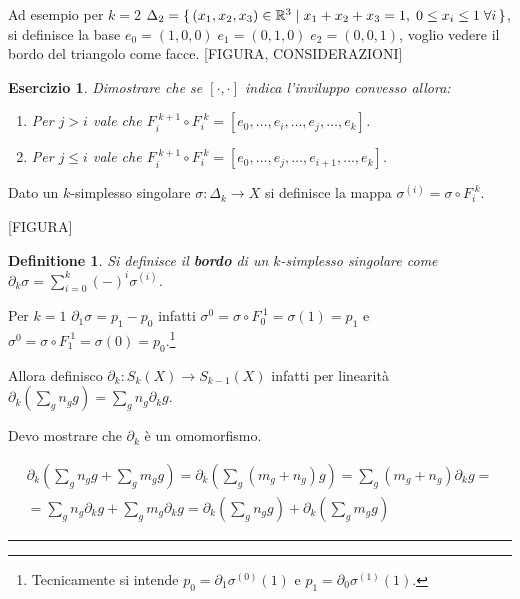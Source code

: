 \documentclass{article}
\newtheorem{definition}[theorem]{Definitione}
\newcounter{exercises}
\newtheorem{exercise}[exercises]{Esercizio}
\newenvironment{proof}{{\bf Dimostrazione:}}{\hfill\rule{2mm}{2mm}}
\newcommand{\RN}[1][]{\mathbb{R}^#1}
\begin{document}
Ad esempio per $ k = 2 $ $ \Delta_2 = \set{ (x_1,x_2,x_3) \in \RN{3} | x_1 + x_2 + x_3 = 1, \; 0 \leq x_i \leq 1 \; \forall i} $,
si definisce la base $ e_0 = (1,0,0) \; e_1 = (0,1,0) \; e_2 = (0,0,1) $, voglio vedere il bordo del triangolo
come facce.
[FIGURA, CONSIDERAZIONI]

\begin{exercise}
  Dimostrare che se $ [\cdot, \cdot] $ indica l'inviluppo convesso allora:
  \begin{enumerate}
  \item Per $ j > i $ vale che $ F_i^{\; k+1} \circ F_i^{\; k} = [e_0, \dots, e_i, \dots, e_j, \dots, e_k ] $.
  \item Per $ j \leq i $ vale che $ F_i^{\; k+1} \circ F_i^{\; k} = [e_0, \dots, e_j, \dots, e_{i+1}, \dots, e_k ] $.
  \end{enumerate}
\end{exercise}

Dato un $ k $-simplesso singolare $ \sigma: \Delta_k \to X $ si definisce la mappa $ \sigma^{(i)} = \sigma \circ F_i^{\; k} $.

[FIGURA]

\begin{definition}
  Si definisce il \textbf{bordo} di un $ k $-simplesso singolare come $ \partial_k \sigma = \sum_{i=0}^{k}(-)^i \sigma^{(i)} $.
\end{definition}

Per $ k = 1 $ $ \partial_1 \sigma = p_1 - p_0 $ infatti $ \sigma^{0} = \sigma \circ F_0^{\; 1} = \sigma(1) = p_1 $ e $ \sigma^{0} = \sigma \circ F_1^{\; 1} = \sigma(0) = p_0 $.\footnote{Tecnicamente si intende $ p_0 = \partial_1 \sigma^{(0)}(1) $ e $ p_1 = \partial_0 \sigma^{(1)}(1) $.}

Allora definisco $ \partial_k: S_k(X) \to S_{k-1}(X) $ infatti per linearità $ \partial_k \left( \sum_g n_g g\right) = \sum_g n_g \partial_k g $.

Devo mostrare che $ \partial_k $ è un omomorfismo.

\begin{proof}
  \begin{gather*}
  \partial_k \left( \sum_g n_g g + \sum_g m_g g\right) = \partial_k \left( \sum_g(m_g + n_g)g \right) = \sum_g (m_g + n_g) \partial_k g = \\
  = \sum_g n_g \partial_k g + \sum_g m_g \partial_k g = \partial_k \left( \sum_g n_g g\right) + \partial_k \left( \sum_g m_g g \right)
\end{gather*}
\end{proof}
\end{document}
